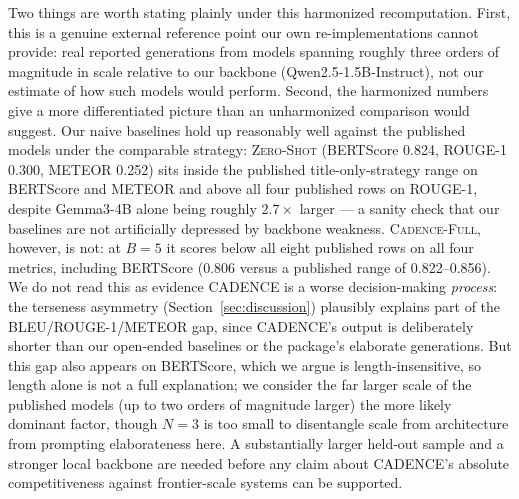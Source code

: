 \documentclass[preprint,12pt,authoryear]{elsarticle}
\newcommand{\sysZS}{\textsc{Zero-Shot}}
\newcommand{\sysFull}{\textsc{Cadence-Full}}
\renewcommand{\_}{\textunderscore\allowbreak{}}
\begin{document}
Two things are worth stating plainly under this harmonized recomputation. First, this is a genuine external reference point our own re-implementations cannot provide: real reported generations from models spanning roughly three orders of magnitude in scale relative to our backbone (Qwen2.5-1.5B-Instruct), not our estimate of how such models would perform. Second, the harmonized numbers give a more differentiated picture than an unharmonized comparison would suggest. Our naive baselines hold up reasonably well against the published models under the comparable strategy: \sysZS{} (BERTScore 0.824, ROUGE-1 0.300, METEOR 0.252) sits inside the published title-only-strategy range on BERTScore and METEOR and above all four published rows on ROUGE-1, despite Gemma3-4B alone being roughly $2.7\times$ larger --- a sanity check that our baselines are not artificially depressed by backbone weakness. \sysFull{}, however, is not: at $B=5$ it scores below all eight published rows on all four metrics, including BERTScore (0.806 versus a published range of 0.822--0.856). We do not read this as evidence CADENCE is a worse decision-making \emph{process}: the terseness asymmetry (Section~\ref{sec:discussion}) plausibly explains part of the BLEU/ROUGE-1/METEOR gap, since CADENCE's output is deliberately shorter than our open-ended baselines or the package's elaborate generations. But this gap also appears on BERTScore, which we argue is length-insensitive, so length alone is not a full explanation; we consider the far larger scale of the published models (up to two orders of magnitude larger) the more likely dominant factor, though $N=3$ is too small to disentangle scale from architecture from prompting elaborateness here. A substantially larger held-out sample and a stronger local backbone are needed before any claim about CADENCE's absolute competitiveness against frontier-scale systems can be supported.
\end{document}
